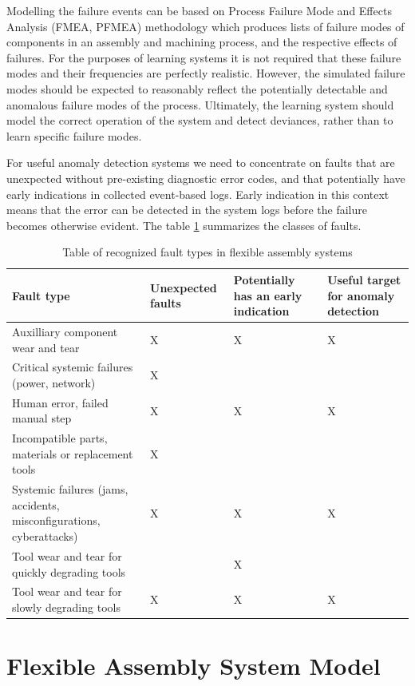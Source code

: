 \documentclass[journal]{IEEEtran}
\begin{document}
Modelling the failure events can be based on Process Failure Mode and Effects Analysis (FMEA, PFMEA) \cite{teng1996failure} methodology which produces lists of
failure modes of components
in an assembly and machining process, and the respective effects of failures. For the purposes of learning systems it is not required that these failure modes and their frequencies
are perfectly realistic. However, the simulated failure modes should be expected to reasonably reflect the potentially detectable and anomalous failure modes of the process.
Ultimately, the learning system should model the correct operation of the system and detect deviances, rather than to learn specific failure modes.

For useful anomaly detection systems we need to concentrate on faults that are unexpected without pre-existing diagnostic error codes, and that potentially have early indications
in collected event-based logs. Early indication in this context means that the error can be detected in the system logs before the failure becomes otherwise evident.
The table \ref{faults} summarizes the classes of faults.

\begin{table}[!t]
\renewcommand{\arraystretch}{1.3}
\caption{Table of recognized fault types in flexible assembly systems}
\label{faults}
\centering
\begin{tabular}{|p{25mm}|p{15mm}|p{15mm}|p{15mm}|}
\hline
Fault type & Unexpected faults & Potentially has an early indication & Useful target for anomaly detection \\
\hline
\hline
Auxilliary component wear and tear & X & X & X \\
\hline
Critical systemic failures (power, network) & X & & \\
\hline
Human error, failed manual step & X & X & X \\
\hline
Incompatible parts, materials or replacement tools & X & & \\
\hline
Systemic failures (jams, accidents, misconfigurations, cyberattacks) & X & X & X \\
\hline
Tool wear and tear for quickly degrading tools & & X & \\
\hline
Tool wear and tear for slowly degrading tools & X & X & X \\
\hline
\end{tabular}
\end{table}

\section{Flexible Assembly System Model}
\end{document}
